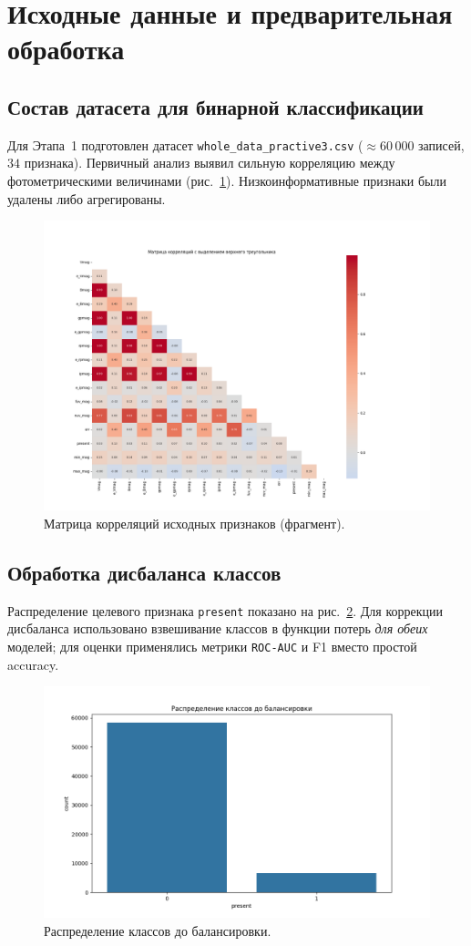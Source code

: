 \documentclass[12pt,a4paper]{article}
\begin{document}
\section{Исходные данные и предварительная обработка}\label{sec:data}
\subsection{Состав датасета для бинарной классификации}
Для Этапа~1 подготовлен датасет \texttt{whole\_data\_practive3.csv} ($\approx60\,000$ записей, $34$ признака). 
Первичный анализ выявил сильную корреляцию между фотометрическими величинами (рис.~\ref{fig:corr}). 
Низкоинформативные признаки были удалены либо агрегированы.

\begin{figure}[H]
    \centering
    \includegraphics[width=\linewidth]{correlation_matrix.png}
    \caption{Матрица корреляций исходных признаков (фрагмент).}
    \label{fig:corr}
\end{figure}

\subsection{Обработка дисбаланса классов}
Распределение целевого признака \texttt{present} показано на рис.~\ref{fig:class_before}. 
Для коррекции дисбаланса использовано взвешивание классов в функции потерь \emph{для обеих} моделей; для оценки применялись метрики \texttt{ROC‑AUC} и F1 вместо простой accuracy.

\begin{figure}[H]
    \centering
    \includegraphics[width=.7\linewidth]{class_distribution_before.png}
    \caption{Распределение классов до балансировки.}
    \label{fig:class_before}
\end{figure}
\end{document}

